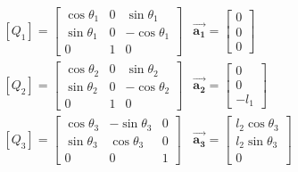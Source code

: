 \documentclass[conference]{IEEEtran}
\begin{document}
\begin{small}
    \begin{align*}
         & \left[Q_1\right] = \begin{bmatrix}
                                  \cos \theta_1 & 0 & \sin \theta_1   \\
                                  \sin \theta_1 & 0 & - \cos \theta_1 \\
                                  0             & 1 & 0
                              \end{bmatrix} & \vec{\mathbf{a_1}} =
        \begin{bmatrix}
            0 \\
            0 \\
            0
        \end{bmatrix}                                             \\
         & \left[Q_2\right] = \begin{bmatrix}
                                  \cos \theta_2 & 0 & \sin \theta_2   \\
                                  \sin \theta_2 & 0 & - \cos \theta_2 \\
                                  0             & 1 & 0
                              \end{bmatrix} & \vec{\mathbf{a_2}} =
        \begin{bmatrix}
            0 \\
            0 \\
            -l_1
        \end{bmatrix}                                             \\
         & \left[Q_3\right] = \begin{bmatrix}
                                  \cos \theta_3 & - \sin \theta_3 & 0 \\
                                  \sin \theta_3 & \cos \theta_3   & 0 \\
                                  0             & 0               & 1
                              \end{bmatrix} & \vec{\mathbf{a_3}} =
        \begin{bmatrix}
            l_2 \cos \theta_3 \\
            l_2 \sin \theta_3 \\
            0
        \end{bmatrix}
    \end{align*}
\end{small}
\end{document}
